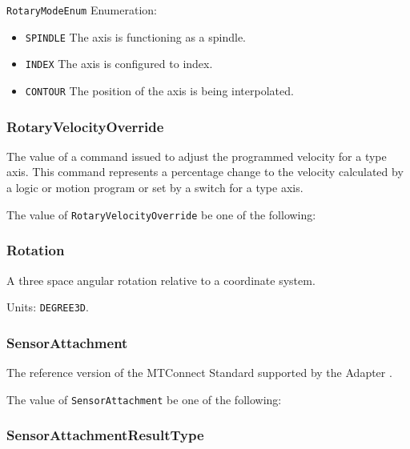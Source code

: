 \texttt{RotaryModeEnum} Enumeration:

\begin{itemize}
\item \texttt{SPINDLE} \newline The axis is functioning as a spindle. 
\item \texttt{INDEX} \newline The axis is configured to index. 
\item \texttt{CONTOUR} \newline The position of the axis is being interpolated. 
\end{itemize}

\FloatBarrier

\subsubsection{RotaryVelocityOverride}
\label{sec:RotaryVelocityOverride}



The value of a command issued to adjust the programmed velocity for a  type axis.
 This command represents a percentage change to the velocity calculated by a logic or motion program or set by a switch for a  type axis.


The value of \texttt{RotaryVelocityOverride} \MUST be one of the following: 

\FloatBarrier

\subsubsection{Rotation}




A three space angular rotation relative to a coordinate system.


Units: \texttt{DEGREE\textunderscore 3D}.

\subsubsection{SensorAttachment}
\label{sec:SensorAttachment}



The reference version of the MTConnect Standard supported by the \gls{Adapter}
.


The value of \texttt{SensorAttachment} \MUST be one of the following: 

\FloatBarrier

\subsubsection{SensorAttachmentResultType}
\label{sec:SensorAttachmentResultType}






